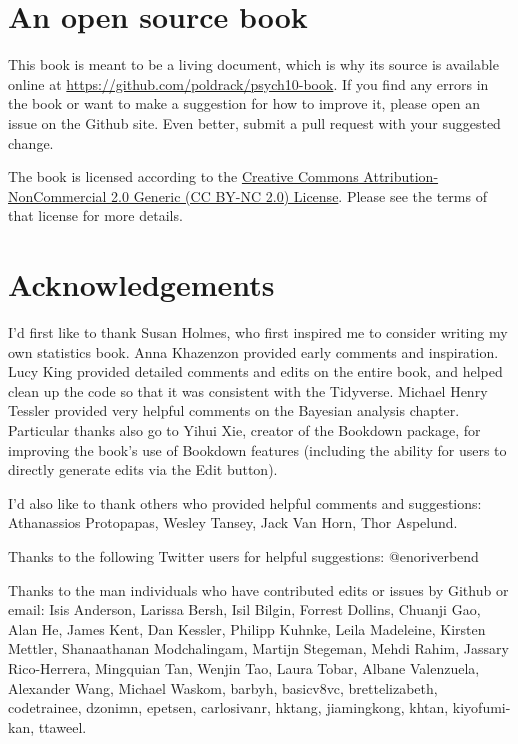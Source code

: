\documentclass[12pt,]{book}
\theoremstyle{definition}
\theoremstyle{definition}
\theoremstyle{definition}
\theoremstyle{remark}
\begin{document}
\hypertarget{an-open-source-book}{%
\section{An open source book}\label{an-open-source-book}}

This book is meant to be a living document, which is why its source is available online at \url{https://github.com/poldrack/psych10-book}. If you find any errors in the book or want to make a suggestion for how to improve it, please open an issue on the Github site. Even better, submit a pull request with your suggested change.

The book is licensed according to the \href{https://creativecommons.org/licenses/by-nc/2.0/}{Creative Commons Attribution-NonCommercial 2.0 Generic (CC BY-NC 2.0) License}. Please see the terms of that license for more details.

\hypertarget{acknowledgements}{%
\section{Acknowledgements}\label{acknowledgements}}

I'd first like to thank Susan Holmes, who first inspired me to consider writing my own statistics book. Anna Khazenzon provided early comments and inspiration. Lucy King provided detailed comments and edits on the entire book, and helped clean up the code so that it was consistent with the Tidyverse. Michael Henry Tessler provided very helpful comments on the Bayesian analysis chapter. Particular thanks also go to Yihui Xie, creator of the Bookdown package, for improving the book's use of Bookdown features (including the ability for users to directly generate edits via the Edit button).

I'd also like to thank others who provided helpful comments and suggestions: Athanassios Protopapas, Wesley Tansey, Jack Van Horn, Thor Aspelund.

Thanks to the following Twitter users for helpful suggestions: @enoriverbend

Thanks to the man individuals who have contributed edits or issues by Github or email:
Isis Anderson, Larissa Bersh, Isil Bilgin, Forrest Dollins, Chuanji Gao, Alan He, James Kent, Dan Kessler, Philipp Kuhnke, Leila Madeleine, Kirsten Mettler, Shanaathanan Modchalingam, Martijn Stegeman, Mehdi Rahim, Jassary Rico-Herrera, Mingquian Tan, Wenjin Tao, Laura Tobar, Albane Valenzuela, Alexander Wang, Michael Waskom,
barbyh, basicv8vc, brettelizabeth, codetrainee, dzonimn, epetsen, carlosivanr, hktang, jiamingkong, khtan, kiyofumi-kan, ttaweel.
\end{document}
